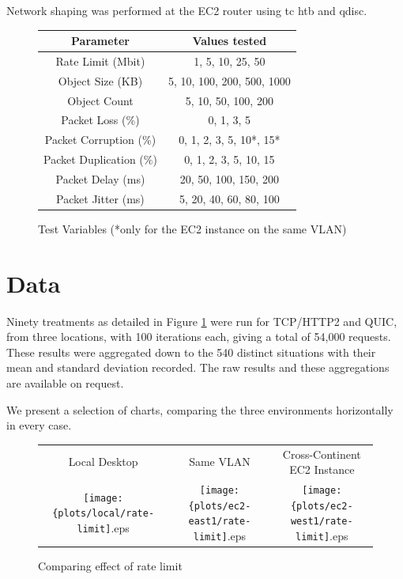 \documentclass[12pt]{article}
\begin{document}
Network shaping was performed at the EC2 router using tc htb and qdisc.
\begin{figure}
\centering
\begin{tabular}{c|c}
	Parameter	&	Values tested 	\\\hline
	Rate Limit (Mbit) 	&	1, 5, 10, 25, 50	\\
	Object Size (KB)	&	5, 10, 100, 200, 500, 1000	\\
	Object Count &	5, 10, 50, 100, 200	\\
	Packet Loss (\%)	&	0, 1, 3, 5	\\
	Packet Corruption (\%) & 0, 1, 2, 3, 5, 10*, 15* \\
	Packet Duplication (\%) & 0, 1, 2, 3, 5, 10, 15 \\
	Packet Delay (ms)		&	20, 50, 100, 150, 200	\\
	Packet Jitter (ms)		& 5, 20, 40, 60, 80, 100 \\
\end{tabular}
\caption{Test Variables (*only for the EC2 instance on the same VLAN)}
\label{test_variables}
\end{figure}

\section{Data}
\label{data}

Ninety treatments as detailed in Figure \ref{test_variables} were run for TCP/HTTP2 and QUIC, from three locations, with 100 iterations each, giving a total of 54,000 requests. These results were aggregated down to the 540 distinct situations with their mean and standard deviation recorded. The raw results and these aggregations are available on request.

We present a selection of charts, comparing the three environments horizontally in every case.

\begin{figure}[h]
\centering
\begin{tabular}{c c c}
	Local Desktop & Same VLAN & Cross-Continent EC2 Instance \\
	\texttt{[image: \{plots/local/rate-limit]}.eps} &
	\texttt{[image: \{plots/ec2-east1/rate-limit]}.eps} &
	\texttt{[image: \{plots/ec2-west1/rate-limit]}.eps} \\
\end{tabular}
\caption{Comparing effect of rate limit}
\label{figs:rate_limit}
\end{figure}
\end{document}
